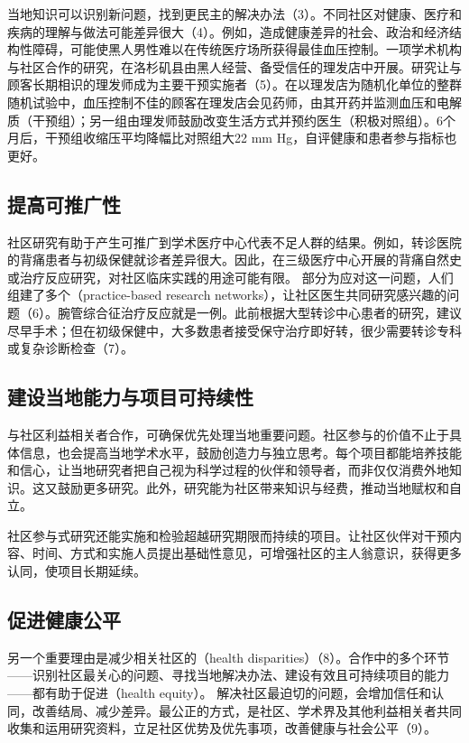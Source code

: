 当地知识可以识别新问题，找到更民主的解决办法（3）。不同社区对健康、医疗和疾病的理解与做法可能差异很大（4）。例如，造成健康差异的社会、政治和经济结构性障碍，可能使黑人男性难以在传统医疗场所获得最佳血压控制。一项学术机构与社区合作的研究，在洛杉矶县由黑人经营、备受信任的理发店中开展。研究让与顾客长期相识的理发师成为主要干预实施者（5）。在以理发店为随机化单位的整群随机试验中，血压控制不佳的顾客在理发店会见药师，由其开药并监测血压和电解质（干预组）；另一组由理发师鼓励改变生活方式并预约医生（积极对照组）。6个月后，干预组收缩压平均降幅比对照组大22 mm Hg，自评健康和患者参与指标也更好。

\subsection{提高可推广性}
社区研究有助于产生可推广到学术医疗中心代表不足人群的结果。例如，转诊医院的背痛患者与初级保健就诊者差异很大。因此，在三级医疗中心开展的背痛自然史或治疗反应研究，对社区临床实践的用途可能有限。
部分为应对这一问题，人们组建了多个（practice-based research networks），让社区医生共同研究感兴趣的问题（6）。腕管综合征治疗反应就是一例。此前根据大型转诊中心患者的研究，建议尽早手术；但在初级保健中，大多数患者接受保守治疗即好转，很少需要转诊专科或复杂诊断检查（7）。

\subsection{建设当地能力与项目可持续性}
与社区利益相关者合作，可确保优先处理当地重要问题。社区参与的价值不止于具体信息，也会提高当地学术水平，鼓励创造力与独立思考。每个项目都能培养技能和信心，让当地研究者把自己视为科学过程的伙伴和领导者，而非仅仅消费外地知识。这又鼓励更多研究。此外，研究能为社区带来知识与经费，推动当地赋权和自立。

社区参与式研究还能实施和检验超越研究期限而持续的项目。让社区伙伴对干预内容、时间、方式和实施人员提出基础性意见，可增强社区的主人翁意识，获得更多认同，使项目长期延续。

\subsection{促进健康公平}
另一个重要理由是减少相关社区的（health disparities）（8）。合作中的多个环节——识别社区最关心的问题、寻找当地解决办法、建设有效且可持续项目的能力——都有助于促进（health equity）。
解决社区最迫切的问题，会增加信任和认同，改善结局、减少差异。最公正的方式，是社区、学术界及其他利益相关者共同收集和运用研究资料，立足社区优势及优先事项，改善健康与社会公平（9）。

